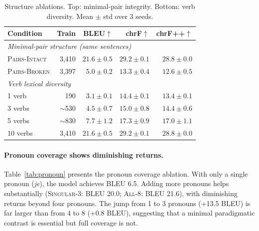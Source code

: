 \documentclass[11pt]{article}
\begin{document}
\begin{table}[t]
\centering
\small
\caption{Structure ablations. Top: minimal-pair integrity. Bottom: verb diversity. Mean $\pm$ std over 3 seeds.}
\label{tab:structure_matters}
\begin{tabular}{lrrrr}
\toprule
\textbf{Condition} & \textbf{Train} & \textbf{BLEU}$\uparrow$ & \textbf{chrF}$\uparrow$ & \textbf{chrF++}$\uparrow$ \\
\midrule
\multicolumn{5}{l}{\textit{Minimal-pair structure (same sentences)}} \\
\textsc{Pairs-Intact}  & 3,410 & $\mathbf{21.6 \pm 0.5}$ & $\mathbf{29.2 \pm 0.1}$ & $\mathbf{28.8 \pm 0.0}$ \\
\textsc{Pairs-Broken}  & 3,397 & $5.0 \pm 0.2$           & $13.3 \pm 0.4$          & $12.6 \pm 0.5$ \\
\midrule
\multicolumn{5}{l}{\textit{Verb lexical diversity}} \\
1 verb   &          190 & $3.1 \pm 0.1$ & $14.4 \pm 0.1$ & $13.4 \pm 0.1$ \\
3 verbs  & ${\sim}$530  & $4.5 \pm 0.7$ & $15.0 \pm 0.8$ & $14.4 \pm 0.6$ \\
5 verbs  & ${\sim}$830  & $7.7 \pm 1.2$ & $17.3 \pm 0.9$ & $17.0 \pm 1.1$ \\
10 verbs &        3,410 & $\mathbf{21.6 \pm 0.5}$ & $\mathbf{29.2 \pm 0.1}$ & $\mathbf{28.8 \pm 0.0}$ \\
\bottomrule
\end{tabular}
\end{table}

\paragraph{Pronoun coverage shows diminishing returns.} Table~\ref{tab:pronoun} presents the pronoun coverage ablation. With only a single pronoun (\emph{je}), the model achieves BLEU 6.5. Adding more pronouns helps substantially (\textsc{Singular-3}: BLEU 20.0; \textsc{All-8}: BLEU 21.6), with diminishing returns beyond four pronouns. The jump from 1 to 3 pronouns (+13.5 BLEU) is far larger than from 4 to 8 (+0.8 BLEU), suggesting that a minimal paradigmatic contrast is essential but full coverage is not.
\end{document}
